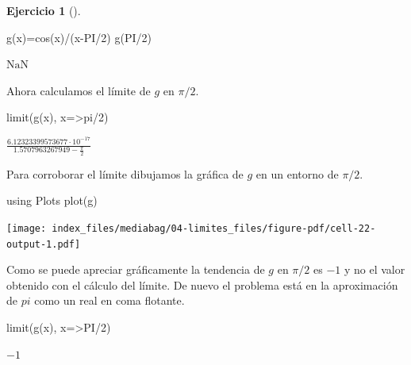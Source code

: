 \documentclass[
  a4paper,
]{scrreport}
\newenvironment{Shaded}{\begin{snugshade}}{\end{snugshade}}
\newcommand{\BuiltInTok}[1]{\textcolor[rgb]{0.00,0.23,0.31}{#1}}
\newcommand{\ConstantTok}[1]{\textcolor[rgb]{0.56,0.35,0.01}{#1}}
\newcommand{\FloatTok}[1]{\textcolor[rgb]{0.68,0.00,0.00}{#1}}
\newcommand{\FunctionTok}[1]{\textcolor[rgb]{0.28,0.35,0.67}{#1}}
\newcommand{\ImportTok}[1]{\textcolor[rgb]{0.00,0.46,0.62}{#1}}
\newcommand{\NormalTok}[1]{\textcolor[rgb]{0.00,0.23,0.31}{#1}}
\newcommand{\OperatorTok}[1]{\textcolor[rgb]{0.37,0.37,0.37}{#1}}
\theoremstyle{definition}
\newtheorem{exercise}{Ejercicio}[chapter]
\theoremstyle{remark}
\begin{document}
\begin{exercise}[]
\begin{enumerate}
\begin{tcolorbox}
\begin{Shaded}
\begin{Highlighting}[]
\FunctionTok{g}\NormalTok{(x)}\OperatorTok{=}\FunctionTok{cos}\NormalTok{(x)}\OperatorTok{/}\NormalTok{(x}\OperatorTok{{-}}\NormalTok{PI}\OperatorTok{/}\FloatTok{2}\NormalTok{)}
\FunctionTok{g}\NormalTok{(PI}\OperatorTok{/}\FloatTok{2}\NormalTok{)}
\end{Highlighting}
\end{Shaded}

  $\text{NaN}$

  Ahora calculamos el límite de \(g\) en \(\pi/2\).

\begin{Shaded}
\begin{Highlighting}[]
\FunctionTok{limit}\NormalTok{(}\FunctionTok{g}\NormalTok{(x), x}\OperatorTok{=\textgreater{}}\ConstantTok{pi}\OperatorTok{/}\FloatTok{2}\NormalTok{)}
\end{Highlighting}
\end{Shaded}

  $\frac{6.12323399573677 \cdot 10^{-17}}{1.5707963267949 - \frac{\pi}{2}}$

  Para corroborar el límite dibujamos la gráfica de \(g\) en un entorno
  de \(\pi/2\).

\begin{Shaded}
\begin{Highlighting}[]
\ImportTok{using} \BuiltInTok{Plots}
\FunctionTok{plot}\NormalTok{(g)}
\end{Highlighting}
\end{Shaded}

  \texttt{[image: index\_files/mediabag/04-limites\_files/figure-pdf/cell-22-output-1.pdf]}

  Como se puede apreciar gráficamente la tendencia de \(g\) en \(\pi/2\)
  es \(-1\) y no el valor obtenido con el cálculo del límite. De nuevo
  el problema está en la aproximación de \(pi\) como un real en coma
  flotante.

\begin{Shaded}
\begin{Highlighting}[]
\FunctionTok{limit}\NormalTok{(}\FunctionTok{g}\NormalTok{(x), x}\OperatorTok{=\textgreater{}}\NormalTok{PI}\OperatorTok{/}\FloatTok{2}\NormalTok{)}
\end{Highlighting}
\end{Shaded}

  $-1$

  \end{tcolorbox}
\end{enumerate}

\end{exercise}
\end{document}
